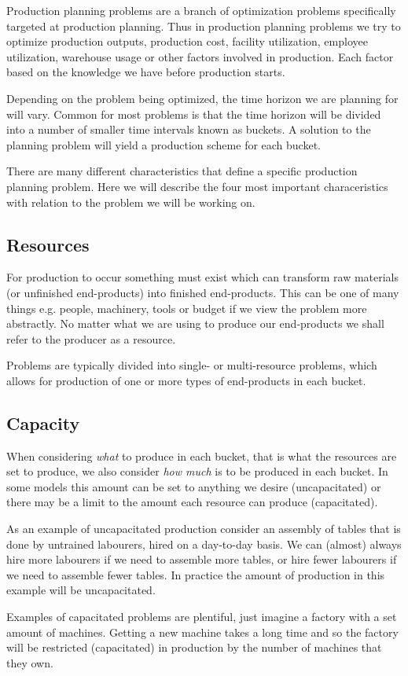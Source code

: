 Production planning problems are a branch of optimization problems
specifically targeted at production planning. Thus in production
planning problems we try to optimize production outputs, production
cost, facility utilization, employee utilization, warehouse usage or
other factors involved in production. Each factor based on the knowledge we
have before production starts.

Depending on the problem being optimized, the time horizon we are
planning for will vary. Common for most problems is that the time
horizon will be divided into a number of smaller time intervals known
as buckets. A solution to the planning problem will yield a production
scheme for each bucket.

There are many different characteristics that define a specific
production planning problem. Here we will describe the four most
important characeristics with relation to the problem we will be working
on.

\subsection{Resources}
\label{sec:resources}

For production to occur something must exist which can transform raw
materials (or unfinished end-products) into finished
end-products. This can be one of many things e.g. people, machinery,
tools or budget if we view the problem more abstractly. No matter what
we are using to produce our end-products we shall refer to the
producer as a resource.

Problems are typically divided into single- or multi-resource
problems, which allows for production of one or more types of
end-products in each bucket.

\subsection{Capacity}
\label{sec:capacity}
When considering \emph{what} to produce in each bucket, that is what
the resources are set to produce, we also consider \emph{how much} is to be
produced in each bucket. In some models this amount can be set
to anything we desire (uncapacitated) or there may be a limit to the
amount each resource can produce (capacitated).

\begin{example} 
As an example of uncapacitated production consider an assembly of
tables that is done by untrained labourers, hired on a day-to-day
basis. We can (almost) always hire more labourers if we need to
assemble more tables, or hire fewer labourers if we need to assemble
fewer tables. In practice the amount of production in this example
will be uncapacitated.
\end{example}
Examples of capacitated problems are plentiful, just imagine a factory
with a set amount of machines. Getting a new machine takes a long time
and so the factory will be restricted (capacitated) in production by
the number of machines that they own.

